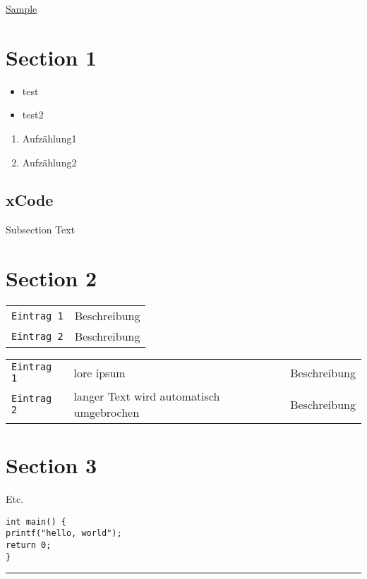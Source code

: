 \raggedright
\footnotesize
\begin{multicols}{3}	
	\setlength{\premulticols}{1pt}
	\setlength{\postmulticols}{1pt}
	\setlength{\multicolsep}{1pt}
	\setlength{\columnsep}{2pt}

\begin{center}
     \Large{\underline{Sample}} \\
\end{center}

\section{Section 1}
\begin{itemize}
	\item test
	\item test2
\end{itemize}
\begin{enumerate}
	\item Aufzählung1
	\item Aufzählung2
\end{enumerate}
\subsection{xCode}
Subsection Text

\section{Section 2}

\begin{tabular}{@{}p{\the\MyLen}%
		@{}p{\linewidth-\the\MyLen}@{}}
	\texttt{Eintrag 1} & Beschreibung \\
	\texttt{Eintrag 2} & Beschreibung \\
\end{tabular}	

\begin{tabular}{@{}p{\the\MyLen}%
		@{}p{\the\MyLenTwo}%
		@{}p{\linewidth-\the\MyLen-\the\MyLenTwo}@{}}
	\texttt{Eintrag 1} & lore ipsum & Beschreibung \\
	\texttt{Eintrag 2} & langer Text wird automatisch umgebrochen & Beschreibung \\
\end{tabular}	
\lipsum[1-15]
\section{Section 3}
Etc.
\begin{verbatim}
int main() {
printf("hello, world");
return 0;
}
\end{verbatim}
\rule{0.3\linewidth}{0.25pt}
\scriptsize


\end{multicols}
